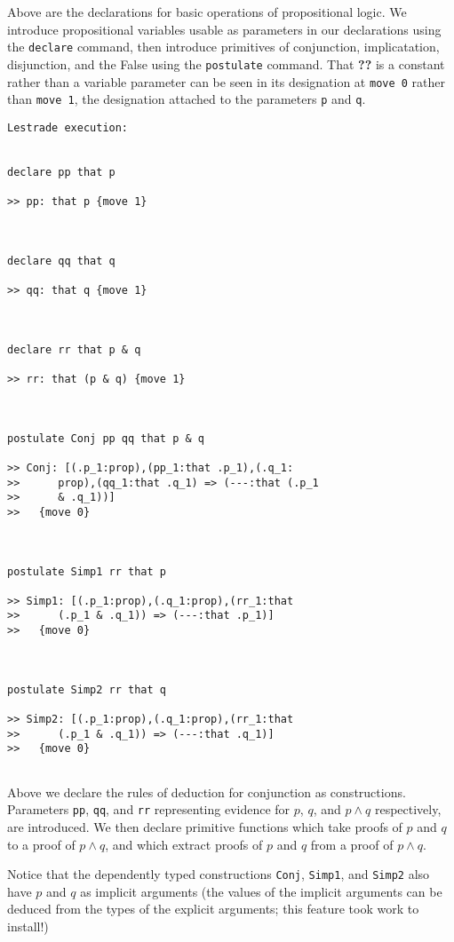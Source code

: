 \documentclass[12pt]{article}
\begin{document}
Above are the declarations for basic operations of propositional logic.  We introduce propositional variables usable as parameters in our declarations using the {\tt declare\/} command, then
introduce primitives of conjunction, implicatation, disjunction, and the False using the {\tt postulate\/} command.  That {\bf ??} is a constant rather than a variable parameter
can be seen in its designation at {\tt move 0\/} rather than {\tt move 1\/}, the designation attached to the parameters {\tt p} and {\tt q\/}.

\begin{verbatim}Lestrade execution:


declare pp that p

>> pp: that p {move 1}



declare qq that q

>> qq: that q {move 1}



declare rr that p & q

>> rr: that (p & q) {move 1}



postulate Conj pp qq that p & q

>> Conj: [(.p_1:prop),(pp_1:that .p_1),(.q_1:
>>      prop),(qq_1:that .q_1) => (---:that (.p_1
>>      & .q_1))]
>>   {move 0}



postulate Simp1 rr that p

>> Simp1: [(.p_1:prop),(.q_1:prop),(rr_1:that
>>      (.p_1 & .q_1)) => (---:that .p_1)]
>>   {move 0}



postulate Simp2 rr that q

>> Simp2: [(.p_1:prop),(.q_1:prop),(rr_1:that
>>      (.p_1 & .q_1)) => (---:that .q_1)]
>>   {move 0}


\end{verbatim}

Above we declare the rules of deduction for conjunction as constructions.   Parameters {\tt pp}, {\tt qq}, and {\tt rr} representing evidence for $p$, $q$, and $p \wedge q$ respectively, are introduced.  We then declare primitive functions which take proofs of $p$ and $q$ to a proof of $p \wedge q$, and which extract proofs of $p$ and $q$ from a proof of $p \wedge q$.

Notice that the dependently typed constructions {\tt Conj}, {\tt Simp1}, and {\tt Simp2} also have $p$ and $q$ as implicit arguments (the values of the implicit arguments can be deduced from the types of the explicit arguments;  this feature took work to install!)
\end{document}
